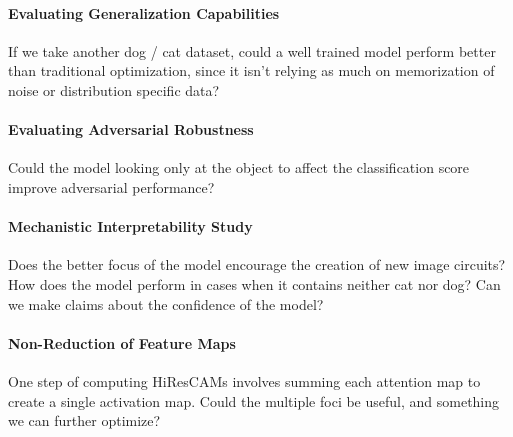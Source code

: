 \documentclass{article}
\begin{document}
\paragraph{Evaluating Generalization Capabilities} If we take another dog / cat dataset, could a well trained model perform better than traditional optimization, since it isn't relying as much on memorization of noise or distribution specific data?

\paragraph{Evaluating Adversarial Robustness} Could the model looking only at the object to affect the classification score improve adversarial performance?

\paragraph{Mechanistic Interpretability Study} Does the better focus of the model encourage the creation of new image circuits? How does the model perform in cases when it contains neither cat nor dog? Can we make claims about the confidence of the model?

\paragraph{Non-Reduction of Feature Maps} One step of computing HiResCAMs involves summing each attention map to create a single activation map. Could the multiple foci be useful, and something we can further optimize?



\end{document}
